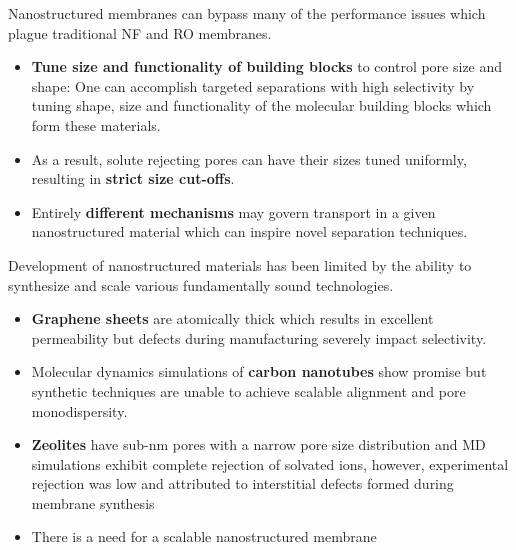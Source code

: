 \documentclass{article}
\begin{document}
  Nanostructured membranes can bypass many of the performance issues which
  plague traditional NF and RO membranes.
  \begin{itemize}
    \item \textbf{Tune size and functionality of building blocks} to control pore
    size and shape: One can accomplish targeted separations with high 
    selectivity by tuning shape, size and functionality of the molecular
    building blocks which form these materials. %
    \item As a result, solute rejecting pores can have their sizes tuned
    uniformly, resulting in \textbf{strict size cut-offs}.
    \item Entirely \textbf{different mechanisms} may govern transport in a given
    nanostructured material which can inspire novel separation techniques.
  \end{itemize}
  
  Development of nanostructured materials has been limited by the ability
  to synthesize and scale various fundamentally sound technologies.
  \begin{itemize}
    \item \textbf{Graphene sheets} are atomically thick which results in excellent
    permeability but defects during manufacturing severely impact 
    selectivity. \cite{cohen-tanugi_multilayer_2016}
    \item Molecular dynamics simulations of \textbf{carbon nanotubes} show
    promise \cite{humplik_nanostructured_2011} but synthetic techniques are 
    unable to achieve scalable alignment and pore monodispersity.\cite{hata_water-assisted_2004,maruyama_growth_2005}
    \item \textbf{Zeolites} have sub-nm pores with a narrow pore size 
    distribution and MD simulations exhibit complete rejection of solvated ions, \cite{murad_molecular_1998}
    however, experimental rejection was low and attributed to interstitial
    defects formed during membrane synthesis \cite{li_desalination_2004}
    \item There is a need for a scalable nanostructured membrane
  \end{itemize}
  
\end{document}
